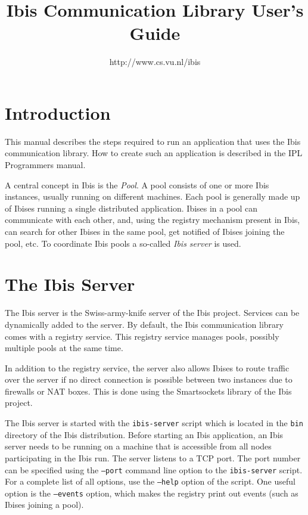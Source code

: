 \documentclass[a4paper,10pt]{article}
\begin{document}
\title{Ibis Communication Library User's Guide}

\author{http://www.cs.vu.nl/ibis}

\maketitle

\section{Introduction}

This manual describes the steps required to run an application that 
uses the Ibis communication library. How to create such an application
is described in the IPL Programmers manual.

A central concept in Ibis is the \emph{Pool}. A pool consists of one or
more Ibis instances, usually running on different machines. Each pool is
generally made up of Ibises running a single distributed application.
Ibises in a pool can communicate with each other, and, using the
registry mechanism present in Ibis, can search for other Ibises in the
same pool, get notified of Ibises joining the pool, etc. To
coordinate Ibis pools a so-called \emph{Ibis server} is used.

\section{The Ibis Server}

The Ibis server is the Swiss-army-knife server of the Ibis project.
Services can be dynamically added to the server. By default, the Ibis
communication library comes with a registry service. This registry
service manages pools, possibly multiple pools at the same time.  

In addition to the registry service, the server also allows
Ibises to route traffic over the server if no direct connection is
possible between two instances due to firewalls or NAT boxes. This is
done using the Smartsockets library of the Ibis project.

The Ibis server is started with the \texttt{ibis-server} script which is
located in the \texttt{bin} directory of the Ibis distribution.  Before
starting an Ibis application, an Ibis server needs to be running on a
machine that is accessible from all nodes participating in the Ibis run.
The server listens to a TCP port. The port number can be specified using
the \texttt{--port} command line option to the \texttt{ibis-server}
script.  For a complete list of all options, use the \texttt{--help}
option of the script. One useful option is the  \texttt{--events}
option, which makes the registry print out events (such as Ibises
joining a pool).
\end{document}
